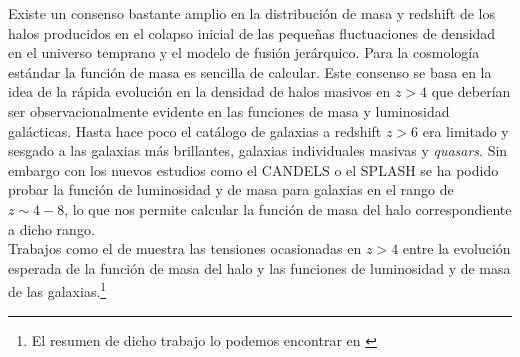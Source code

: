 \documentclass{article}
\begin{document}
Existe un consenso bastante amplio en la distribución de masa y redshift de los halos producidos en el colapso inicial de las pequeñas fluctuaciones de densidad en el universo temprano y el modelo de fusión jerárquico. Para la cosmología estándar la función de masa es sencilla de calcular. Este consenso se basa en la idea de la rápida evolución en la densidad de halos masivos en $z>4$ que deberían ser observacionalmente evidente en las funciones de masa y luminosidad galácticas. Hasta hace poco el catálogo de galaxias a redshift $z>6$ era limitado y sesgado a las galaxias más brillantes, galaxias individuales masivas y \textit{quasars}. Sin embargo con los nuevos estudios como el CANDELS o el SPLASH se ha podido probar la función de luminosidad y de masa para galaxias en el rango de $z\sim 4-8$, lo que nos permite calcular la función de masa del halo correspondiente a dicho rango.\\

Trabajos como el de \cite{finkelstein2015increasing} muestra las tensiones ocasionadas en $z>4$ entre la evolución esperada de la función de masa del halo y las funciones de luminosidad y de masa de las galaxias.\footnote{El resumen de dicho trabajo lo podemos encontrar en \cite{arranz2015finkelstein}} \\
\end{document}
